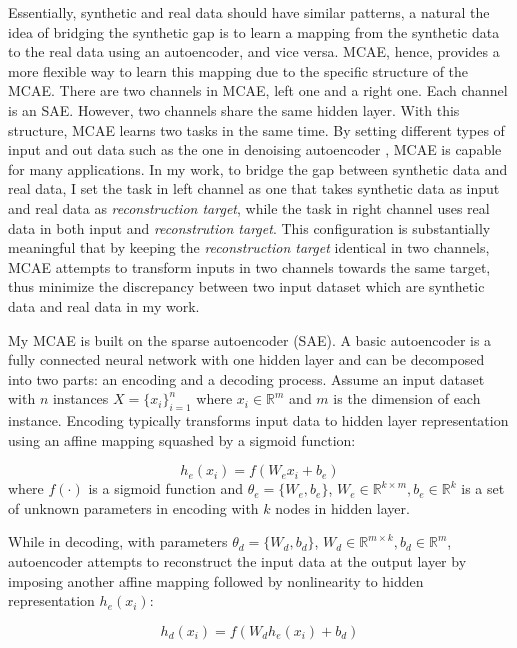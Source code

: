 \documentclass{iitthesis}
\begin{document}
Essentially, synthetic and real data should have similar patterns, a natural
the idea of bridging the synthetic gap is to learn a mapping from the synthetic data to the real data using an autoencoder, and vice versa. MCAE, hence, provides a more flexible way to learn this mapping due to the specific structure of the MCAE. There are two channels in MCAE, left one and a right one. Each channel is an SAE. However, two channels share the same hidden layer. With this structure, MCAE learns two tasks in the same time. By setting different types of input and out data such as the one in denoising autoencoder \cite{VP:10}, MCAE is capable for many applications. In my work, to bridge the gap between synthetic data and real data, I set the task in left channel as one that takes synthetic data as input and real data as \textit{reconstruction target}, while the task in right channel uses real data in both input and \textit{reconstrution target}. This configuration is substantially meaningful that by keeping the \textit{reconstruction target} identical in two channels, MCAE attempts to transform inputs in two channels towards the same target, thus minimize the discrepancy between two input dataset which are synthetic data and real data in my work.

 My MCAE is built on the sparse autoencoder (SAE). A basic autoencoder is a fully connected neural network with one hidden layer and can be decomposed into two parts: an encoding and a decoding process. Assume an input dataset with $n$ instances $X=\{x_{i}\}_{i=1}^{n}$ where $x_{i}\in{\mathbb{R}^{m}}$ and $m$ is the dimension of each instance. Encoding typically transforms input data to hidden layer representation using an affine mapping squashed by a sigmoid function:

\begin{equation}
h_{e}(x_{i})=f(W_{e}x_{i}+b_{e})\label{eq:encoder}
\end{equation}
where $f(\cdot)$ is a sigmoid function and $\theta_{e}=\{W_{e},b_{e}\}$,
$W_{e}\in\mathbb{R}^{k\times m},b_{e}\in\mathbb{R}^{k}$ is a set
of unknown parameters in encoding with $k$ nodes in hidden layer.

While in decoding, with parameters $\theta_{d}=\{W_{d},b_{d}\}$, $W_{d}\in\mathbb{R}^{m\times k},b_{d}\in\mathbb{R}^{m}$, autoencoder attempts to reconstruct the input data at the output layer by imposing
another affine mapping followed by nonlinearity to hidden representation $h_{e}(x_{i})$:

\begin{equation}
h_{d}(x_{i})=f(W_{d}h_{e}(x_{i})+b_{d})\label{eq:decoding}
\end{equation}
\end{document}
